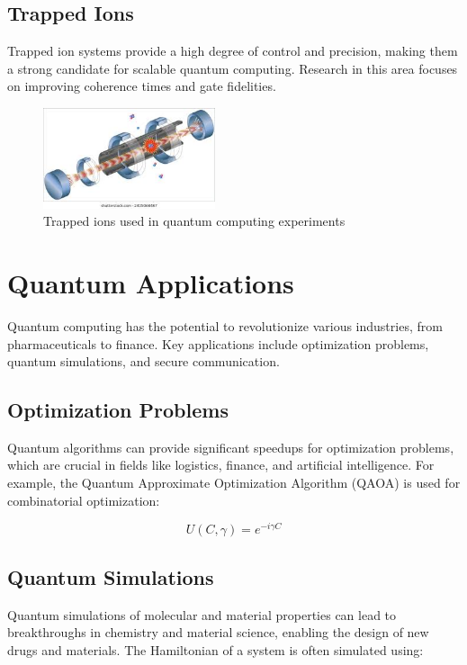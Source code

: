\documentclass[conference]{IEEEtran}
\begin{document}
\subsection{Trapped Ions}
Trapped ion systems provide a high degree of control and precision, making them a strong candidate for scalable quantum computing. Research in this area focuses on improving coherence times and gate fidelities.

\begin{figure}[h]
\centering
\includegraphics[width=0.45\textwidth]{image2.jpeg}
\caption{Trapped ions used in quantum computing experiments}
\label{fig:trapped_ions}
\end{figure}

\section{Quantum Applications}
Quantum computing has the potential to revolutionize various industries, from pharmaceuticals to finance. Key applications include optimization problems, quantum simulations, and secure communication.

\subsection{Optimization Problems}
Quantum algorithms can provide significant speedups for optimization problems, which are crucial in fields like logistics, finance, and artificial intelligence. For example, the Quantum Approximate Optimization Algorithm (QAOA) is used for combinatorial optimization:

\begin{equation}
    U(C, \gamma) = e^{-i \gamma C}
\end{equation}

\subsection{Quantum Simulations}
Quantum simulations of molecular and material properties can lead to breakthroughs in chemistry and material science, enabling the design of new drugs and materials. The Hamiltonian of a system is often simulated using:
\end{document}
